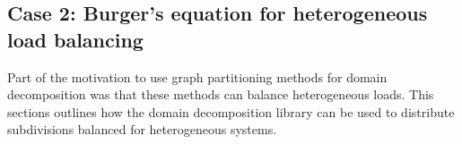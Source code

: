 
\newpage
\subsection{Case 2: Burger's equation for heterogeneous load balancing}
Part of the motivation to use graph partitioning methods for domain decomposition was that these methods can balance heterogeneous loads.
This sections outlines how the domain decomposition library can be used to distribute subdivisions balanced for heterogeneous systems.

